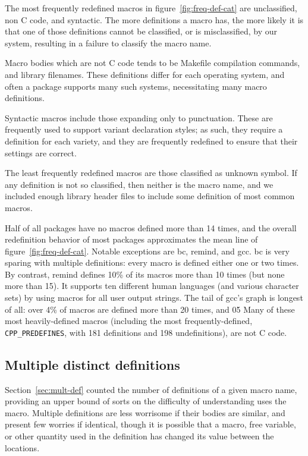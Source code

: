 \documentclass[10pt]{article}
\newcommand{\pkg}[1]{\textsf{#1}}
\begin{document}
The most frequently redefined macros in figure~\ref{fig:freq-def-cat} are
unclassified, non C code, and syntactic.  The more definitions a macro has,
the more likely it is that one of those definitions cannot be classified,
or is misclassified, by our system, resulting in a failure to classify the
macro name.

Macro bodies which are not C code tends to be Makefile compilation
commands, and library filenames.  These definitions differ for each
operating system, and often a package supports many such systems,
necessitating many macro definitions.  

Syntactic macros include those expanding only to punctuation.  These are
frequently used to support variant declaration styles; as such, they
require a definition for each variety, and they are frequently redefined to
ensure that their settings are correct.

The least frequently redefined macros are those classified as unknown
symbol.  If any definition is not so classified, then neither is the
macro name, and we included enough library header files to include some
definition of most common macros.

Half of all packages have no macros defined more than 14 times, and the
overall redefinition behavior of most packages approximates the mean line
of figure~\ref{fig:freq-def-cat}.  Notable exceptions are \pkg{bc},
\pkg{remind}, and \pkg{gcc}.  \pkg{bc} is very sparing with multiple
definitions: every macro is defined either one or two times.  By contrast, 
\pkg{remind} defines 10\% of its macros more than 10 times (but none more
than 15).  It supports ten different human languages (and various character
sets) by using macros for all user output strings.
The tail of \pkg{gcc}'s graph is longest of all:  over 4\% of macros are
defined more than 20 times, and 0\.5%
Many of these most heavily-defined macros (including the most
frequently-defined, \verb|CPP_PREDEFINES|, with  181 definitions and 198
undefinitions), are not C code.



        

\subsection{Multiple distinct definitions}

Section~\ref{sec:mult-def} counted the number of definitions of a given
macro name, providing an upper bound of sorts on the difficulty of
understanding uses the macro.  Multiple definitions are less worrisome if
their bodies are similar, and present few worries if identical, though it
is possible that a macro, free variable, or other quantity used in the
definition has changed its value between the locations.
\end{document}
